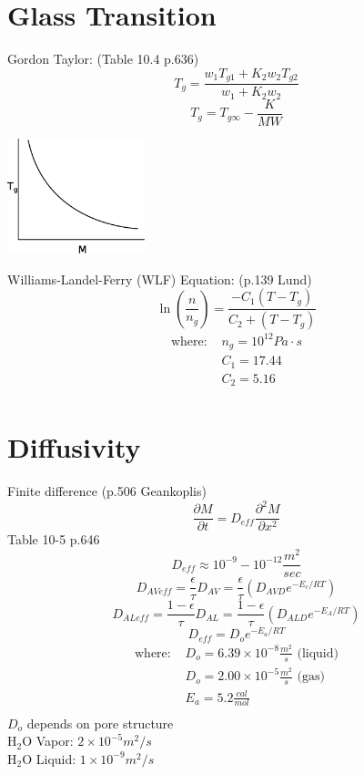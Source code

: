 \documentclass[11pt]{article}
\begin{document}
\section{Glass Transition}
Gordon Taylor: (Table 10.4 p.636)
\[ T_g = \frac{w_1 T_{g1} + K_2 w_2 T_{g2}}{w_1 + K_2 w_2} \]
\[ T_g = T_{g\infty} - \frac{K}{MW} \]

\begin{center}
\includegraphics[width=0.3\textwidth]{pics/eps/glass_transition}
\end{center}

Williams-Landel-Ferry (WLF) Equation: (p.139 Lund)
\[ \ln\left(\frac{n}{n_g}\right) = \frac{-C_1 (T - T_g)}{C_2 + (T - T_g)} \]
\begin{align*}
\text{where: } &n_g = 10^{12} Pa \cdot s \\
& C_1 = 17.44\\
& C_2 = 5.16\\
\end{align*}

\section{Diffusivity}
Finite difference (p.506 Geankoplis)
\[ \frac{\partial M}{\partial t} = D_{eff} \frac{\partial^2 M}{\partial x^2} \]
Table 10-5 p.646
\[ D_{eff} \approx 10^{-9} - 10^{-12} \frac{m^2}{sec} \]
\[ D_{AVeff} = \frac{\epsilon}{\tau} D_{AV} = \frac{\epsilon}{\tau}(D_{AVD} e^{-E_c/RT}) \]
\[ D_{ALeff} = \frac{1-\epsilon}{\tau} D_{AL} = \frac{1-\epsilon}{\tau}(D_{ALD} e^{-E_A/RT}) \]
\[ D_{eff} = D_o e^{-E_a/RT} \]
\begin{align*}
\text{where: } & D_o = 6.39 \times 10^{-8} \frac{m^2}{s} \text{ (liquid)}\\
& D_o = 2.00 \times 10^{-5} \frac{m^2}{s} \text{ (gas)} \\
& E_a = 5.2 \frac{cal}{mol}\\
\end{align*}
$D_o$ depends on pore structure\\
H$_2$O Vapor: $2\times 10^{-5} m^2/s$\\
H$_2$O Liquid: $1\times 10^{-9} m^2/s$
\end{document}
